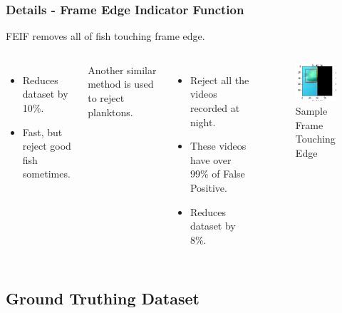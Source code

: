 \documentclass{beamer}[fullspacing]
\begin{document}
\begin{frame}
\frametitle{Details - Frame Edge Indicator Function}

FEIF removes all of fish touching frame edge.

\begin{columns}
\begin{itemize}
\item
Reduces dataset by 10\%.
\item
Fast, but reject good fish sometimes.
\end{itemize}

Another similar method is used to reject planktons.

\begin{itemize}
\item
Reject all the videos recorded at night.
\item
These videos have over 99\% of False Positive.
\item
Reduces dataset by 8\%.
\end{itemize}

\begin{figure}
\includegraphics[scale=0.5]{image/FEIF.png}
\caption{Sample Frame Touching Edge}
\end{figure}
\end{columns}

\end{frame}



\subsection{Ground Truthing Dataset}
\end{document}
